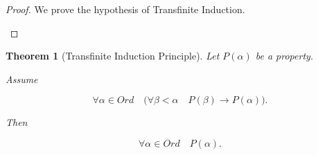 \documentclass[10pt,a4paper]{book}
\newtheorem{theorem}{Theorem}[section]
\begin{document}
\begin{proof}

    We prove the hypothesis of Transfinite Induction.

    \begin{fitchproof}[arrayenv=tabular]

        \open

        \open
         
        \close

        \open
         
         
        \close

        \open
         
        \close

         

        \close



    \end{fitchproof}

\end{proof}

\begin{theorem}[Transfinite Induction Principle]

    Let $P(\alpha)$ be a property.

    Assume

    \[
        \forall \alpha\in Ord
        \quad
        \Big(
        \forall \beta<\alpha \quad P(\beta)
        \to
        P(\alpha)
        \Big).
    \]

    Then

    \[
        \forall \alpha\in Ord \quad P(\alpha).
    \]

\end{theorem}
\end{document}
